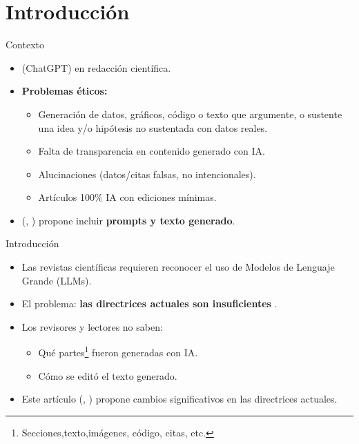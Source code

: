 
\section{Introducción}
\begin{frame}{Contexto}
    \begin{itemize}
        \item {} (ChatGPT) en redacción científica.
        \item \textbf{Problemas éticos:}
              \begin{itemize}
                  \item Generación de datos, gráficos, código o texto que argumente, o sustente una idea y/o hipótesis no sustentada con datos reales.
                  \item Falta de transparencia en contenido generado con IA.
                  \item Alucinaciones (datos/citas falsas, no intencionales).
                  \item Artículos 100\% IA con ediciones mínimas.
              \end{itemize}
        \item {} (\citeauthor{Kendall2024}, \citeyear{Kendall2024}) propone incluir \textbf{prompts y texto generado}\cite{Kendall2024}.
    \end{itemize}
\end{frame}
\begin{frame}{Introducción}
    \begin{itemize}
        \item Las revistas científicas requieren reconocer el uso de Modelos de Lenguaje Grande (LLMs).
        \item El problema: \textbf{las directrices actuales son insuficientes} \cite{Kendall2024}.
        \item Los revisores y lectores no saben:
              \begin{itemize}
                  \item Qué partes\footnote{Secciones,texto,imágenes, código, citas, etc.} fueron generadas con IA.
                  \item Cómo se editó el texto generado.
              \end{itemize}
        \item Este artículo (\citeauthor{Kendall2024}, \citeyear{Kendall2024}) propone cambios significativos en las directrices actuales.
    \end{itemize}
\end{frame}

